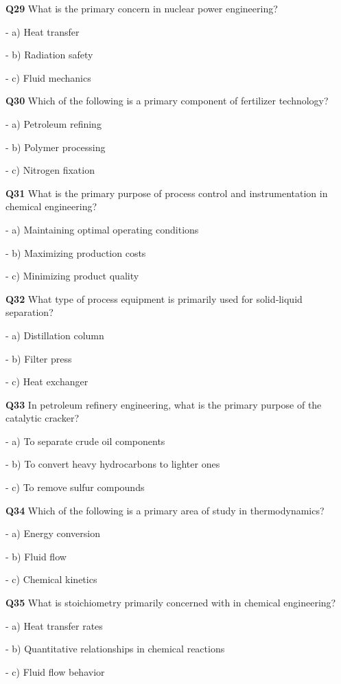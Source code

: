 \textbf{Q29} What is the primary concern in nuclear power engineering?\par
\quad - a) Heat transfer\par
\quad - b) Radiation safety\par
\quad - c) Fluid mechanics\par

\textbf{Q30} Which of the following is a primary component of fertilizer technology?\par
\quad - a) Petroleum refining\par
\quad - b) Polymer processing\par
\quad - c) Nitrogen fixation\par

\textbf{Q31} What is the primary purpose of process control and instrumentation in chemical engineering?\par
\quad - a) Maintaining optimal operating conditions\par
\quad - b) Maximizing production costs\par
\quad - c) Minimizing product quality\par

\textbf{Q32} What type of process equipment is primarily used for solid‑liquid separation?\par
\quad - a) Distillation column\par
\quad - b) Filter press\par
\quad - c) Heat exchanger\par

\textbf{Q33} In petroleum refinery engineering, what is the primary purpose of the catalytic cracker?\par
\quad - a) To separate crude oil components\par
\quad - b) To convert heavy hydrocarbons to lighter ones\par
\quad - c) To remove sulfur compounds\par

\textbf{Q34} Which of the following is a primary area of study in thermodynamics?\par
\quad - a) Energy conversion\par
\quad - b) Fluid flow\par
\quad - c) Chemical kinetics\par

\textbf{Q35} What is stoichiometry primarily concerned with in chemical engineering?\par
\quad - a) Heat transfer rates\par
\quad - b) Quantitative relationships in chemical reactions\par
\quad - c) Fluid flow behavior\par

